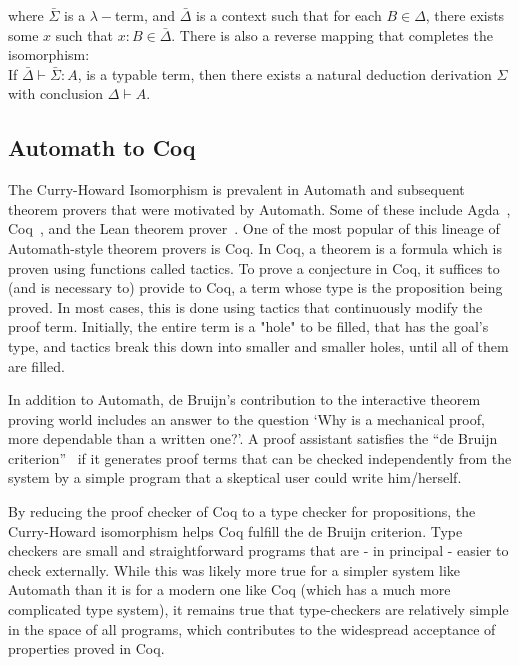\documentclass{article}
\begin{document}
	\noindent where $\bar{\Sigma}$ is a 
	$\lambda-$term,	and $\bar{\Delta}$ is a 
	context such that for each $B \in \Delta$, 
	there exists some $x$ such that 
	$x : B \in \bar{\Delta}$. There is also a 
	reverse mapping that completes the isomorphism:\\
	
	\noindent If $\bar{\Delta} \vdash \bar{\Sigma} 
	: A$, is a typable term, then 
	there exists a natural deduction derivation 
	$\Sigma$ with conclusion $\Delta \vdash A$.
	
	
	\subsection{Automath to Coq}
	\label{sec:coq}
	The Curry-Howard Isomorphism is prevalent in 
	Automath and subsequent theorem provers that 
	were motivated by Automath. Some of these 
	include Agda~\cite{norell:thesis}, 
	Coq~\cite{CoPa89}, and the Lean theorem 
	prover~\cite{10.1007/978-3-319-21401-6_26}.
	One of the most popular of this lineage of 
	Automath-style theorem provers is Coq. In 
	Coq, a theorem is a formula which is 
	proven using functions called tactics. To 
	prove a conjecture in Coq, it suffices to 
	(and is necessary to) provide 
	to Coq, a term whose type is the proposition 
	being proved. In most cases, this is done 
	using tactics that continuously modify the 
	proof term. Initially, the entire term is a 
	"hole" to be filled, that has the goal's 
	type, and tactics break this down into smaller 
	and smaller holes, until all of them are 
	filled.
	
	In addition to Automath, de Bruijn's 
	contribution to the interactive theorem 
	proving world includes an answer to the 
	question `Why is a mechanical proof, 
	more dependable than a written one?'.
	A proof assistant satisfies the 
	``de Bruijn criterion''~\cite
	{10.5555/778522.778527} if it generates 
	proof terms that can be checked 
	independently from the system by a simple 
	program that a skeptical user could write 
	him/herself.
	
	By reducing the proof checker of Coq to 
	a type checker for propositions, the 
	Curry-Howard isomorphism helps Coq
	fulfill the de Bruijn criterion. Type 
	checkers are small and 
	straightforward programs that are - 
	in principal - easier to check 
	externally. 
	While this was likely 
	more true for a simpler system like 
	Automath than it is for a modern 
	one like Coq (which has a much 
	more complicated type system), it 
	remains true that type-checkers are 
	relatively simple in the space of 
	all programs, which contributes to 
	the widespread acceptance of 
	properties proved in Coq.
	
\end{document}

